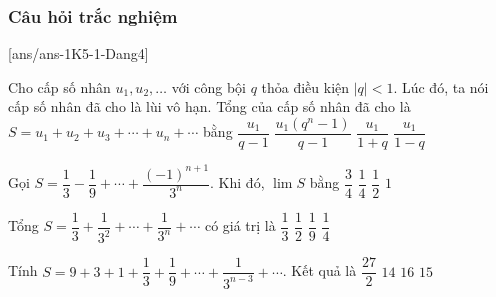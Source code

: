 \subsubsection{Câu hỏi trắc nghiệm}
[ans/ans-1K5-1-Dang4]
\begin{ex}%
	Cho cấp số nhân $u_1,u_2,\ldots$ với công bội $q$ thỏa điều kiện $|q|<1$. Lúc đó, ta nói cấp số nhân đã cho là lùi vô hạn. Tổng của cấp số nhân đã cho là $S=u_1+u_2+u_3+\cdots +u_n+\cdots$ bằng 
	\choice
	{$\dfrac{u_1}{q-1}$}
	{$\dfrac{u_1\left(q^n-1\right)}{q-1}$}
	{$\dfrac{u_1}{1+q}$}
	{\True $\dfrac{u_1}{1-q}$}
\end{ex}
\begin{ex}%
	Gọi $S=\dfrac{1}{3}-\dfrac{1}{9}+\cdots +\dfrac{(-1)^{n+1}}{3^n}$. Khi đó, $\lim S$ bằng 
	\choice
	{$\dfrac{3}{4}$}
	{\True $\dfrac{1}{4}$}
	{$\dfrac{1}{2}$}
	{$1$}
\end{ex}
\begin{ex}%
	Tổng $S=\dfrac{1}{3}+\dfrac{1}{3^2}+\cdots +\dfrac{1}{3^n}+\cdots$ có giá trị là 
	\choice
	{$\dfrac{1}{3}$}
	{\True $\dfrac{1}{2}$}
	{$\dfrac{1}{9}$}
	{$\dfrac{1}{4}$}
\end{ex}
\begin{ex}%
	Tính $S=9+3+1+\dfrac{1}{3}+\dfrac{1}{9}+\cdots +\dfrac{1}{3^{n-3}}+\cdots$. Kết quả là 
	\choice
	{\True $\dfrac{27}{2}$}
	{$14$}
	{$16$}
	{$15$}
\end{ex}
